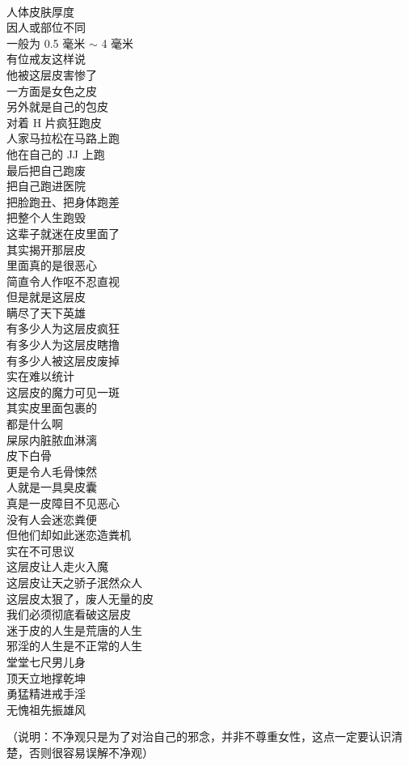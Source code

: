 \begin{poem}[皮之魔]
    \begin{multicols}{2}
        \begin{center}~\\
            人体皮肤厚度 \\ 因人或部位不同 \\ 一般为 0.5 毫米 $\sim$ 4 毫米 \\ 有位戒友这样说 \\ 他被这层皮害惨了 \\ 一方面是女色之皮 \\ 另外就是自己的包皮 \\ 对着 H 片疯狂跑皮 \\ 人家马拉松在马路上跑 \\ 他在自己的 JJ 上跑 \\ 最后把自己跑废 \\ 把自己跑进医院 \\ 把脸跑丑、把身体跑差 \\ 把整个人生跑毁 \\ 这辈子就迷在皮里面了 \\ 其实揭开那层皮 \\ 里面真的是很恶心 \\ 简直令人作呕不忍直视 \\ 但是就是这层皮 \\ 瞒尽了天下英雄 \\ 有多少人为这层皮疯狂 \\ 有多少人为这层皮瞎撸 \\ 有多少人被这层皮废掉 \\ 实在难以统计 \\ 这层皮的魔力可见一斑 \\ 其实皮里面包裹的 \\ 都是什么啊 \\ 屎尿内脏脓血淋漓 \\ 皮下白骨 \\ 更是令人毛骨悚然 \\ 人就是一具臭皮囊 \\ 真是一皮障目不见恶心 \\ 没有人会迷恋粪便 \\ 但他们却如此迷恋造粪机 \\ 实在不可思议 \\ 这层皮让人走火入魔 \\ 这层皮让天之骄子泯然众人 \\ 这层皮太狠了，废人无量的皮 \\ 我们必须彻底看破这层皮 \\ 迷于皮的人生是荒唐的人生 \\ 邪淫的人生是不正常的人生 \\ 堂堂七尺男儿身 \\ 顶天立地撑乾坤 \\ 勇猛精进戒手淫 \\ 无愧祖先振雄风
        \end{center}
    \end{multicols}
\end{poem}

（说明：不净观只是为了对治自己的邪念，并非不尊重女性，这点一定要认识清楚，否则很容易误解不净观）
